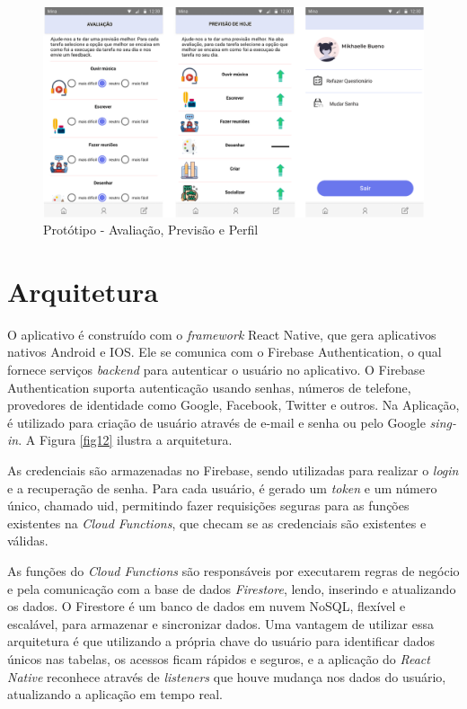\begin{figure}[htbp]
	\caption{Protótipo - Avaliação, Previsão e Perfil}
	\begin{center}
	\includegraphics[keepaspectratio=true,scale=0.3]{figuras/prototipo3-v.png}
	\end{center}
    \label{fig11}
\end{figure}

\newpage 
\section{Arquitetura}
\label{arq}

O aplicativo é construído com o \emph{framework} React Native, que gera aplicativos nativos Android e IOS. 
Ele se comunica com o Firebase Authentication, o qual fornece serviços \emph{backend} para autenticar 
o usuário no aplicativo. O Firebase Authentication suporta 
autenticação usando senhas, números de telefone, provedores de identidade como Google, Facebook, Twitter e 
outros. Na Aplicação, é utilizado para criação de usuário através de e-mail e senha ou 
pelo Google \emph{sing-in}. A Figura \ref{fig12} ilustra a arquitetura.

As credenciais são armazenadas no Firebase, sendo utilizadas para realizar o 
\emph{login} e a recuperação de senha. Para cada usuário, é gerado um \emph{token} e um número único, chamado uid, permitindo 
fazer requisições seguras para as funções existentes na \emph{Cloud Functions}, que checam se as credenciais 
são existentes e válidas.

As funções do \emph{Cloud Functions} são responsáveis por executarem regras de negócio e 
pela comunicação com a base de dados \emph{Firestore}, lendo, inserindo e atualizando os dados. 
O Firestore é um banco de dados em nuvem NoSQL, flexível e escalável, para armazenar e sincronizar dados.
Uma vantagem de utilizar essa arquitetura é que utilizando a própria chave do usuário para identificar 
dados únicos nas tabelas, os acessos ficam rápidos e seguros, e a aplicação do \emph{React Native} reconhece 
através de \emph{listeners} que houve mudança nos dados do usuário, atualizando a aplicação em tempo real.
 
